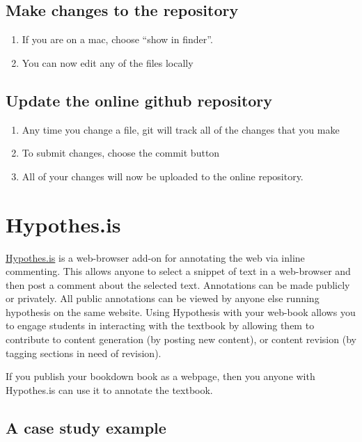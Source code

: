 \documentclass[]{book}
\providecommand{\tightlist}{%
  \setlength{\itemsep}{0pt}\setlength{\parskip}{0pt}}
\theoremstyle{definition}
\theoremstyle{definition}
\theoremstyle{definition}
\theoremstyle{remark}
\begin{document}
\section{Make changes to the
repository}\label{make-changes-to-the-repository}

\begin{enumerate}
\def\labelenumi{\arabic{enumi}.}
\tightlist
\item
  If you are on a mac, choose ``show in finder''.
\item
  You can now edit any of the files locally
\end{enumerate}

\section{Update the online github
repository}\label{update-the-online-github-repository}

\begin{enumerate}
\def\labelenumi{\arabic{enumi}.}
\tightlist
\item
  Any time you change a file, git will track all of the changes that you
  make
\item
  To submit changes, choose the commit button
\item
  All of your changes will now be uploaded to the online repository.
\end{enumerate}

\chapter{Hypothes.is}\label{hypothes.is-1}

\href{https://web.hypothes.is}{Hypothes.is} is a web-browser add-on for
annotating the web via inline commenting. This allows anyone to select a
snippet of text in a web-browser and then post a comment about the
selected text. Annotations can be made publicly or privately. All public
annotations can be viewed by anyone else running hypothesis on the same
website. Using Hypothesis with your web-book allows you to engage
students in interacting with the textbook by allowing them to contribute
to content generation (by posting new content), or content revision (by
tagging sections in need of revision).

If you publish your bookdown book as a webpage, then you anyone with
Hypothes.is can use it to annotate the textbook.

\section{A case study example}\label{a-case-study-example}
\end{document}
